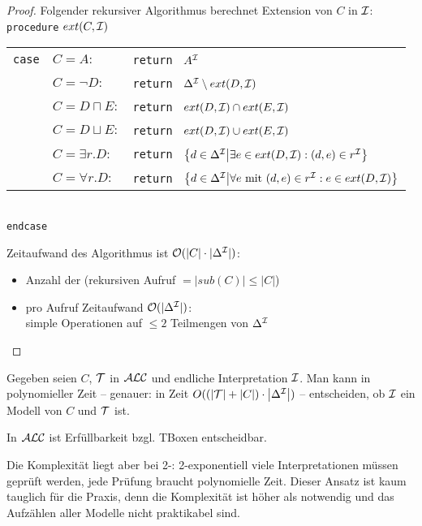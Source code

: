 \begin{proof}
    Folgender rekursiver Algorithmus berechnet Extension von $C$ in $\mathcal{I}$:\\
    \texttt{procedure} $ext(C, \mathcal{I})$\\
    \begin{tabular}{l l l}
        \texttt{case} & $C = A:$ & \texttt{return } $A^{\mathcal{I}}$\\
                      & $C = \neg D:$ & \texttt{return }
        $\Delta^{\mathcal{I}} \setminus ext(D, \mathcal{I})$\\
                      & $C = D \sqcap E:$ & \texttt{return }
        $ext(D, \mathcal{I}) \cap ext(E, \mathcal{I})$\\
                      & $C = D \sqcup E:$ & \texttt{return }
        $ext(D, \mathcal{I}) \cup ext(E, \mathcal{I})$\\
                      & $C = \exists r.D:$ & \texttt{return }
        $\left\{d\in \Delta^\MI \middle| \exists e\in ext(D, \MI) : (d, e) \in r^\MI\right\}$\\
                      & $C = \forall r.D:$ & \texttt{return }
        $\left\{d\in \Delta^\MI \middle| \forall e \text{ mit } (d, e) \in r^\MI : e\in ext(D, \MI)\right\}$\\
    \end{tabular}\\
    \texttt{endcase}

    Zeitaufwand des Algorithmus ist $\mathcal{O}(|C| \cdot |\Delta^{\mathcal{I}}|)$:
    \begin{itemize}
        \item Anzahl der (rekursiven Aufruf $= |sub(C)| \leq |C|$)
        \item pro Aufruf Zeitaufwand $\mathcal{O}(|\Delta^{\mathcal{I}}|)$: \\
            simple Operationen auf $\leq 2$ Teilmengen von $\Delta^{\mathcal{I}}$
    \end{itemize}
\end{proof}

\begin{korollar}
Gegeben seien $C$, $\mathcal{T}$ in $\mathcal{A}\mathcal{L}\mathcal{C}$ und endliche Interpretation $\mathcal{I}$. Man kann in polynomieller Zeit -- genauer: in Zeit $O(\left( \left| \MT \right| + \left| C \right| \right) \cdot \left| \Delta^\MI \right|)$ -- entscheiden, ob $\mathcal{I}$ ein Modell von $C$ und $\mathcal{T}$ ist.
\end{korollar}

\begin{theorem}
In $\mathcal{A}\mathcal{L}\mathcal{C}$ ist Erfüllbarkeit bzgl. TBoxen entscheidbar.
\end{theorem}

Die Komplexität liegt aber bei 2-\ExpTime: 2-exponentiell viele
Interpretationen müssen geprüft werden, jede Prüfung braucht polynomielle Zeit.
Dieser Ansatz ist kaum tauglich für die Praxis, denn die Komplexität ist höher
als notwendig und das Aufzählen aller Modelle nicht praktikabel sind.
